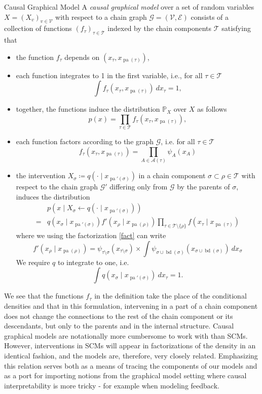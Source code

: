 \documentclass[11pt, a4paper]{memoir}
\theoremstyle{break}
\theoremstyle{break}
\theoremstyle{nonumberplain}
\newcommand{\mP}{\mathbb{P}}
\DeclareMathOperator{\pa}{pa}
\DeclareMathOperator{\bd}{bd}
\begin{document}
\begin{mydefinition}{Causal Graphical Model}
A \emph{causal graphical model} over a set of random variables $X=(X_v)_{v\in \mathcal{V}}$ with respect to a chain graph $\mathcal{G}=(\mathcal{V},\mathcal{E})$ consists of a collection of functions $(f_\tau)_{\tau\in \mathscr{T}}$ indexed by the chain components $\mathscr{T}$ satisfying that
\begin{itemize}
	\item the function $f_\tau$ depends on $\left(x_\tau,x_{\pa(\tau)}\right)$,
	\item each function integrates to 1 in the first variable, i.e., for all $\tau\in \mathscr{T}$
	$$\int f_\tau\left(x_\tau,x_{\pa(\tau)}\right)\ dx_\tau=1,$$
	\item together, the functions induce the distribution $\mP_X$ over $X$ as follows
	$$p(x)=\prod_{\tau\in \mathscr{T}} f_ \tau\left(x_\tau,x_{\pa(\tau)}\right),$$
	\item each function factors according to the graph $\mathcal{G}$, i.e. for all $\tau\in \mathscr{T}$
	$$f_\tau\left(x_\tau,x_{\pa(\tau)}\right)=\prod_{A\in \mathscr{A}(\tau)}\psi_A(x_A)$$
	\item the intervention $X_\sigma\coloneqq q\left(\cdot \mid x_{\pa'(\sigma)}\right)$ in a chain component $\sigma\subset\rho\in \mathscr{T} $ with respect to the chain graph $\mathcal{G}'$ differing only from $\mathcal{G}$ by the parents of $\sigma$, induces the distribution
	\begin{align*}
	&p\left(x \mid X_\sigma\gets q\left(\cdot \mid x_{\pa'(\sigma)}\right)\right)\\
	=&q\left(x_\sigma \mid x_{\pa'(\sigma)}\right)f'\left(x_{\rho}\mid x_{\pa(\rho)}\right)\prod_{\tau\in \mathscr{T}\setminus\{\rho\}} f\left(x_\tau\mid x_{\pa(\tau)}\right)
	\end{align*}
	where we using the factorization \ref{fact} can write
	$$f'\left(x_{\rho}\mid x_{\pa(\rho)}\right)=\psi_{\tau\setminus\sigma}\left(x_{\tau\setminus \sigma}\right)\times \int \psi_{\sigma\cup\bd(\sigma)}\left(x_{\sigma\cup\bd(\sigma)}\right)\ dx_\sigma$$
	We require $q$ to integrate to one, i.e.
	$$\int q\left(x_\sigma\mid x_{\pa'(\sigma)}\right)\ dx_\tau=1.$$
\end{itemize}
\end{mydefinition}
We see that the functions $f_\tau$ in the definition take the place of the conditional densities and that in this formulation, intervening in a part of a chain component does not change the connections to the rest of the chain component or its descendants, but only to the parents and in the internal structure. Causal graphical models are notationally more cumbersome to work with than SCMs. However, interventions in SCMs will appear in factorizations of the density in an identical fashion, and the models are, therefore, very closely related. Emphasizing this relation serves both as a means of tracing the components of our models and as a port for importing notions from the graphical model setting where causal interpretability is more tricky - for example when modeling feedback.\\\\
\end{document}
